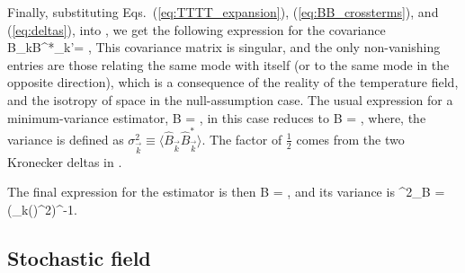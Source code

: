 \ega
\label{eq:BB_crossterms}
\eeq
Finally, substituting Eqs.~(\ref{eq:TTTT_expansion}), (\ref{eq:BB_crossterms}), and (\ref{eq:deltas}), into \eq{\ref{eq:mean_BB}}, we get the following expression for the covariance
\beq
\langle \widehat B_{\vec k}\widehat B^*_{\vec k'}\rangle = ,
\label{eq:B_covariance}
\eeq
This covariance matrix is singular, and the only non-vanishing entries are those relating the same mode with itself (or to the same mode in the opposite direction), which is a consequence of the reality of the temperature field, and the isotropy of space in the null-assumption case. The usual expression for a minimum-variance estimator,
\beq
\widehat B = ,
\label{eq:B_mve}
\eeq
in this case reduces to 
\beq
\bga
\widehat B = ,
\ega
\label{eq:B_mve}
\eeq
where, the variance is defined as $\sigma^2_{\vec k}\equiv\langle \widehat B_{\vec k}\widehat B^*_{\vec k}\rangle $. The factor of $\frac{1}{2}$ comes from the two Kronecker deltas in \eq{\ref{eq:B_covariance}}. 

The final expression for the estimator is then
\beq
\bga
\widehat B = ,
\ega
\label{eq:B_estimator}
\eeq
and its variance is
\beq
\bga
\sigma^2_{\widehat B} = \left(\sum_{\vec k}\left(\right)^{2}\right)^{-1}.
\ega
\label{eq:B_estimator_var}
\eeq

\subsection{Stochastic field}
\label{subsec:SI}

